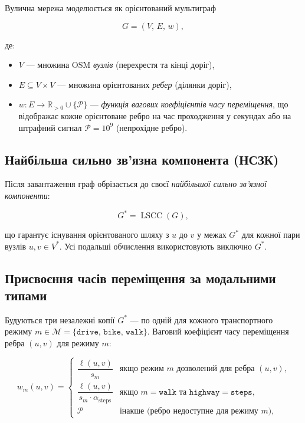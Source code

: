 \documentclass[12pt, a4paper]{article}
\theoremstyle{definition}
\begin{document}
Вулична мережа моделюється як орієнтований мультиграф

\[
  G = (V,\, E,\, w),
\]

\noindent де:
\begin{itemize}
  \item $V$ --- множина OSM \emph{вузлів} (перехрестя та кінці доріг),
  \item $E \subseteq V \times V$ --- множина орієнтованих \emph{ребер}
        (ділянки доріг),
  \item $w : E \to \mathbb{R}_{>0} \cup \{\mathcal{P}\}$ ---
        \emph{функція вагових коефіцієнтів часу переміщення}, що відображає
        кожне орієнтоване ребро на час проходження у секундах або на
        штрафний сигнал $\mathcal{P} = 10^9$ (непрохідне ребро).
\end{itemize}

\subsection{Найбільша сильно зв'язна компонента (НСЗК)}

Після завантаження граф обрізається до своєї \emph{найбільшої сильно
зв'язної компоненти}:

\[
G^* = \mathop{LSCC}(G),
\]

\noindent що гарантує існування орієнтованого шляху з $u$ до $v$ у межах $G^*$
для кожної пари вузлів $u, v \in V^*$. Усі подальші обчислення використовують
виключно $G^*$.

\subsection{Присвоєння часів переміщення за модальними типами}
\label{sec:modal}

Будуються три незалежні копії $G^*$ --- по одній для кожного транспортного
режиму $m \in \mathcal{M} = \{\texttt{drive},\, \texttt{bike},\, \texttt{walk}\}$.
Ваговий коефіцієнт часу переміщення ребра $(u, v)$ для режиму $m$:

\begin{equation}
  \label{eq:travel_time}
  w_m(u,v) =
  \begin{cases}
    \dfrac{\ell(u,v)}{s_m}
      & \text{якщо режим $m$ дозволений для ребра $(u,v)$,} \\[8pt]
    \dfrac{\ell(u,v)}{s_m \cdot \alpha_{\text{steps}}}
      & \text{якщо } m = \texttt{walk} \text{ та } \texttt{highway} = \texttt{steps},\\[8pt]
    \mathcal{P}
      & \text{інакше (ребро недоступне для режиму $m$),}
  \end{cases}
\end{equation}
\end{document}

